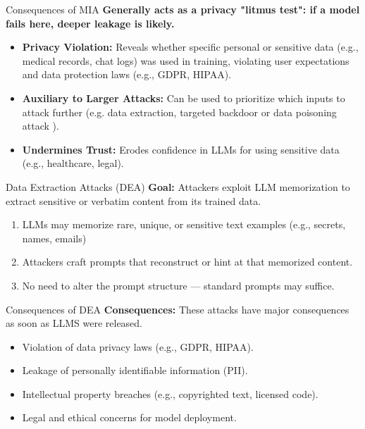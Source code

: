 \documentclass[12pt,aspectratio=169,handout]{beamer}
\begin{document}
\begin{frame}{Consequences of MIA}
\textbf{Generally acts as a privacy "litmus test": if a model fails here, deeper leakage is likely.}

\begin{itemize}
    \item \textbf{Privacy Violation:} Reveals whether specific personal or sensitive data (e.g., medical records, chat logs) was used in training, violating user expectations and data protection laws (e.g., GDPR, HIPAA).
    \item \textbf{Auxiliary to Larger Attacks:} Can be used to prioritize which inputs to attack further (e.g. data extraction, targeted backdoor or data poisoning attack ).
    \item \textbf{Undermines Trust:} Erodes confidence in LLMs for using sensitive data (e.g., healthcare, legal).
\end{itemize}


\end{frame}

\begin{frame}{Data Extraction Attacks (DEA)}
\textbf{Goal:} Attackers exploit LLM memorization to extract sensitive or verbatim content from its trained data.
\begin{enumerate}
    \item LLMs may memorize rare, unique, or sensitive text examples (e.g., secrets, names, emails)
    \item Attackers craft prompts that reconstruct or hint at that memorized content.
    \item No need to alter the prompt structure — standard prompts may suffice.
\end{enumerate}
\end{frame}


\begin{frame}{Consequences of DEA}
\textbf{Consequences:} These attacks have major consequences as soon as LLMS were released.
\begin{itemize}
    \item Violation of data privacy laws (e.g., GDPR, HIPAA).
    \item Leakage of personally identifiable information (PII).
    \item Intellectual property breaches (e.g., copyrighted text, licensed code).
    \item Legal and ethical concerns for model deployment.
\end{itemize}
\end{frame}
\end{document}
